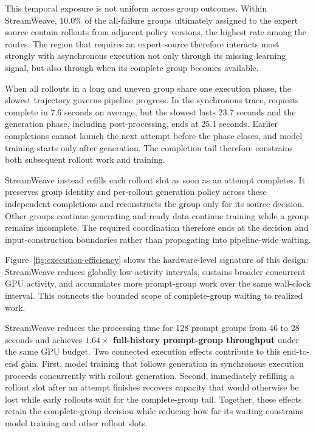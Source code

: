 \documentclass[letterpaper]{article}
\begin{document}
This temporal exposure is not uniform across group outcomes.
Within StreamWeave, 10.0\% of the all-failure groups ultimately assigned to the expert source contain rollouts from adjacent policy versions, the highest rate among the routes.
The region that requires an expert source therefore interacts most strongly with asynchronous execution not only through its missing learning signal, but also through when its complete group becomes available.

When all rollouts in a long and uneven group share one execution phase, the slowest trajectory governs pipeline progress.
In the synchronous trace, requests complete in 7.6 seconds on average, but the slowest lasts 23.7 seconds and the generation phase, including post-processing, ends at 25.1 seconds.
Earlier completions cannot launch the next attempt before the phase closes, and model training starts only after generation.
The completion tail therefore constrains both subsequent rollout work and training.

StreamWeave instead refills each rollout slot as soon as an attempt completes.
It preserves group identity and per-rollout generation policy across these independent completions and reconstructs the group only for its source decision.
Other groups continue generating and ready data continue training while a group remains incomplete.
The required coordination therefore ends at the decision and input-construction boundaries rather than propagating into pipeline-wide waiting.

Figure~\ref{fig:execution-efficiency} shows the hardware-level signature of this design: StreamWeave reduces globally low-activity intervals, sustains broader concurrent GPU activity, and accumulates more prompt-group work over the same wall-clock interval.
This connects the bounded scope of complete-group waiting to realized work.

StreamWeave reduces the processing time for 128 prompt groups from 46 to 28 seconds and achieves \textbf{$1.64\times$ full-history prompt-group throughput} under the same GPU budget.
Two connected execution effects contribute to this end-to-end gain.
First, model training that follows generation in synchronous execution proceeds concurrently with rollout generation.
Second, immediately refilling a rollout slot after an attempt finishes recovers capacity that would otherwise be lost while early rollouts wait for the complete-group tail.
Together, these effects retain the complete-group decision while reducing how far its waiting constrains model training and other rollout slots.
\end{document}
